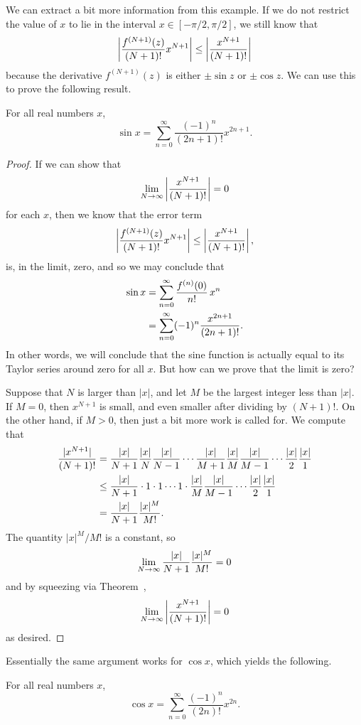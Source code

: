 We can extract a bit more information from this example. If we do not
restrict the value of $x$ to lie in the interval $x \in
[-\pi/2,\pi/2]$, we still know that
$$
  \left|{f^{(N+1)}(z)\over (N+1)!}x^{N+1}\right|\le 
  \left|{x^{N+1}\over (N+1)!}\right|
$$
because the derivative $f^{(N+1)}(z)$ is either $\pm \sin z$ or $\pm
\cos z$.  We can use this to prove the following result.
\begin{theorem}
For all real numbers $x$,
$$
\sin x = \sum_{n=0}^\infty \frac{(-1)^n}{(2n+1)!} x^{2n+1}.
$$
\end{theorem}
\begin{proof}
  If we can show that 
  $$
  \lim_{N\to\infty} \left|{x^{N+1}\over (N+1)!}\right|=0
  $$
  for each $x$, then we know that the error term
  $$
  \left|{f^{(N+1)}(z)\over (N+1)!}x^{N+1}\right|\le 
  \left|{x^{N+1}\over (N+1)!}\right|,
  $$
  is, in the limit, zero, and so we may conclude that
  \begin{align*}
  \sin x&=\sum_{n=0}^\infty{f^{(n)}(0)\over n!}\,x^n \\
  &= \sum_{n=0}^\infty (-1)^n{x^{2n+1}\over (2n+1)!}.
  \end{align*}
  In other words, we will conclude that the sine function is actually
  equal to its Taylor series around zero for all $x$. But how can we prove
  that the limit is zero?

  Suppose that $N$ is larger than $|x|$, and let $M$ be the largest
  integer less than $|x|$.  If $M = 0$, then $x^{N+1}$ is small, and
  even smaller after dividing by $(N+1)!$.  On the other hand, if $M >
  0$, then just a bit more work is called for.  We compute that
  \begin{align*}
    {|x^{N+1}|\over (N+1)!} &= {|x|\over N+1}{|x|\over N}{|x|\over N-1}\cdots
    {|x|\over M+1}{|x|\over M}{|x|\over M-1}\cdots {|x|\over 2}{|x|\over 1} \\
    &\le {|x|\over N+1}\cdot 1\cdot 1\cdots 1\cdot
    {|x|\over M}{|x|\over M-1}\cdots {|x|\over 2}{|x|\over 1} \\
    &={|x|\over N+1}{|x|^M\over M!}.
  \end{align*}
  The quantity $|x|^M/ M!$ is a constant, so 
  $$
  \lim_{N\to\infty} {|x|\over N+1}{|x|^M\over M!} = 0
  $$
  and by squeezing via Theorem~,
  $$
  \lim_{N\to\infty} \left|{x^{N+1}\over (N+1)!}\right|=0
  $$
  as desired.
\end{proof}

Essentially the same argument works for $\cos x$, which yields the following.
\begin{theorem}\label{thm:cosine-is-analytic}
  For all real numbers $x$,
  $$
  \cos x = \sum_{n=0}^\infty \frac{(-1)^n}{(2n)!} x^{2n}.
  $$
\end{theorem}

